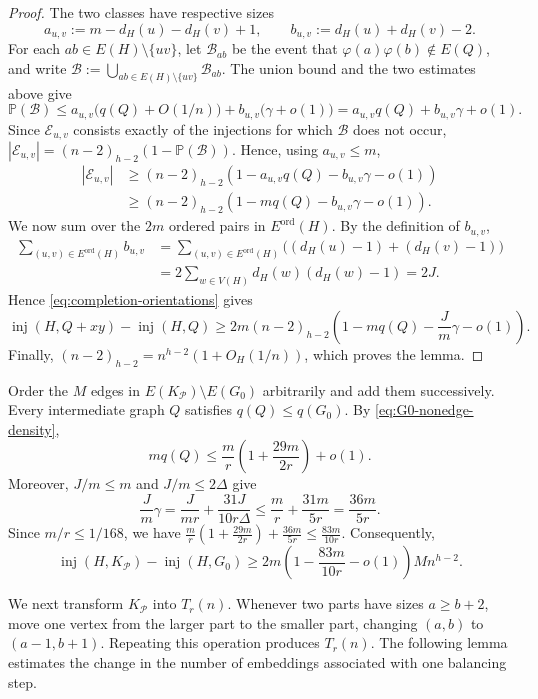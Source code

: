 \documentclass[11pt]{article}
\numberwithin{equation}{section}
\theoremstyle{definition}
\theoremstyle{remark}
\newcommand{\inj}{\operatorname{inj}}
\newcommand{\Prb}{\mathbb P}
\newcommand{\cP}{\mathcal P}
\newcommand{\cE}{\mathcal E}
\begin{document}
\begin{proof}
The two classes have respective sizes
\[
a_{u,v}:=m-d_H(u)-d_H(v)+1,
\qquad
b_{u,v}:=d_H(u)+d_H(v)-2.
\]
For each $ab\in E(H)\setminus\{uv\}$, let $\mathcal B_{ab}$ be the event that $\varphi(a)\varphi(b)\notin E(Q)$, and write $\mathcal B:=\bigcup_{ab\in E(H)\setminus\{uv\}}\mathcal B_{ab}$.
The union bound and the two estimates above give
\[
\Prb(\mathcal B)
\le a_{u,v}\bigl(q(Q)+O(1/n)\bigr)
   +b_{u,v}\bigl(\gamma+o(1)\bigr)
=a_{u,v}q(Q)+b_{u,v}\gamma+o(1).
\]
Since $\cE_{u,v}$ consists exactly of the injections for which $\mathcal B$ does not occur, $|\cE_{u,v}|=(n-2)_{h-2}(1-\Prb(\mathcal B))$. Hence, using $a_{u,v}\le m$,
\begin{align*}
|\cE_{u,v}|
&\ge (n-2)_{h-2}\left(1-a_{u,v}q(Q)-b_{u,v}\gamma-o(1)\right)\\
&\ge (n-2)_{h-2}\left(1-mq(Q)-b_{u,v}\gamma-o(1)\right).
\end{align*}
We now sum over the $2m$ ordered pairs in $E^{\mathrm{ord}}(H)$. By the definition of $b_{u,v}$,
\begin{align*}
\sum_{(u,v)\in E^{\mathrm{ord}}(H)}b_{u,v}
&=\sum_{(u,v)\in E^{\mathrm{ord}}(H)}
  \bigl((d_H(u)-1)+(d_H(v)-1)\bigr)\\
&=2\sum_{w\in V(H)}d_H(w)(d_H(w)-1)=2J.
\end{align*}
Hence \eqref{eq:completion-orientations} gives
\[
\inj(H,Q+xy)-\inj(H,Q)
\ge 2m(n-2)_{h-2}
\left(1-mq(Q)-\frac{J}{m}\gamma-o(1)\right).
\]
Finally, $(n-2)_{h-2}=n^{h-2}(1+O_H(1/n))$, which proves the lemma.
\end{proof}

Order the $M$ edges in $E(K_{\cP})\setminus E(G_0)$ arbitrarily and add them successively. Every intermediate graph $Q$ satisfies $q(Q)\le q(G_0)$. By \eqref{eq:G0-nonedge-density},
\[
mq(Q)\le \frac mr\left(1+\frac{29m}{2r}\right)+o(1).
\]
Moreover, $J/m\le m$ and $J/m\le2\Delta$ give
\begin{equation}
\label{eq:Jgamma}
\frac{J}{m}\gamma
=\frac{J}{mr}+\frac{31J}{10r\Delta}
\le \frac mr+\frac{31m}{5r}=\frac{36m}{5r}.
\end{equation}
Since $m/r\le1/168$, we have
$\frac mr(1+\frac{29m}{2r})+\frac{36m}{5r}\le\frac{83m}{10r}$.
Consequently,
\begin{equation}
\label{eq:completion-total}
\inj(H,K_{\cP})-\inj(H,G_0)
\ge 2m\left(1-\frac{83m}{10r}-o(1)\right)Mn^{h-2}.
\end{equation}

We next transform $K_{\cP}$ into $T_r(n)$. Whenever two parts have sizes $a\ge b+2$, move one vertex from the larger part to the smaller part, changing $(a,b)$ to $(a-1,b+1)$. Repeating this operation produces $T_r(n)$. The following lemma estimates the change in the number of embeddings associated with one balancing step.
\end{document}
